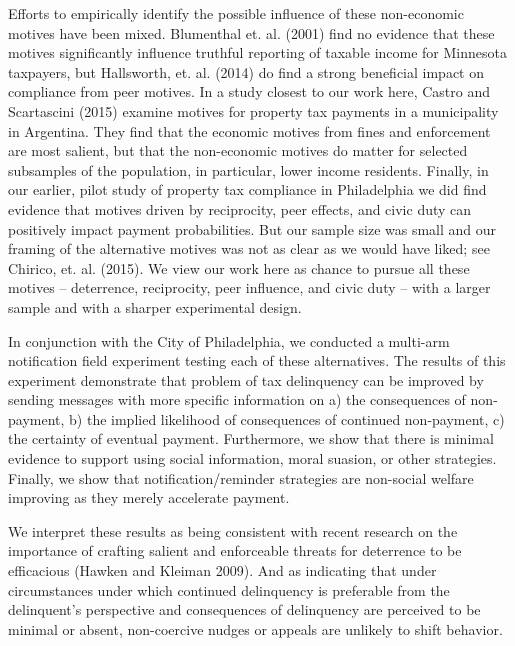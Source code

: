 \documentclass[12pt,titlepage]{article}
\begin{document}
Efforts to empirically identify the possible influence of these non-economic 
motives have been mixed.   Blumenthal et. al. (2001) find no evidence that 
these motives significantly influence truthful reporting of taxable income 
for Minnesota taxpayers, but Hallsworth, et. al. (2014) do find a strong 
beneficial impact on compliance from peer motives.  In a study closest to 
our work here, Castro and Scartascini (2015) examine motives for property 
tax payments in a municipality in Argentina.  They find that the economic 
motives from fines and enforcement are most salient, but that the non-economic 
motives do matter for selected subsamples of the population, in particular, 
lower income residents.   Finally, in our earlier, pilot study of property tax 
compliance in Philadelphia we did find evidence that motives driven by 
reciprocity, peer effects, and civic duty can positively impact payment 
probabilities. But our sample size was small and our framing of the 
alternative motives was not as clear as we would have liked; see 
Chirico, et. al. (2015).  We view our work here as chance to pursue all 
these motives – deterrence, reciprocity, peer influence, and civic duty – 
with a larger sample and with a sharper experimental design.     

In conjunction with the City of Philadelphia, we conducted a multi-arm 
notification field experiment testing each of these alternatives. The 
results of this experiment demonstrate that problem of tax delinquency 
can be improved by sending messages with more specific information on
a) the consequences of non-payment, b) the implied likelihood of 
consequences of continued non-payment, c) the certainty of eventual 
payment. Furthermore, we show that there is minimal evidence to support 
using social information, moral suasion, or other strategies. Finally, 
we show that notification/reminder strategies are non-social welfare 
improving as they merely accelerate payment. 


We interpret these results as being consistent with recent research 
on the importance of crafting salient and enforceable threats for 
deterrence to be efficacious (Hawken and Kleiman 2009). And as indicating 
that under circumstances under which continued delinquency is preferable 
from the delinquent’s perspective and consequences of delinquency are 
perceived to be minimal or absent, non-coercive nudges or appeals are 
unlikely to shift behavior. 
\end{document}
